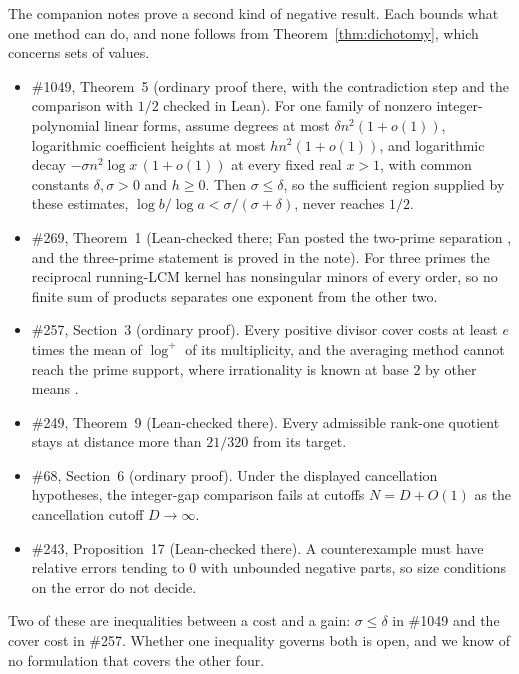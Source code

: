 \documentclass[11pt]{article}
\begin{document}
The companion notes prove a second kind of negative result.  Each bounds what
one method can do, and none follows from Theorem~\ref{thm:dichotomy}, which
concerns sets of values.
\begin{itemize}
\item \#1049, Theorem~5 \cite{plectis1049} (ordinary proof there, with the
  contradiction step and the comparison with $1/2$ checked in Lean).  For one
  family of nonzero integer-polynomial linear forms, assume degrees at most
  $\delta n^2(1+o(1))$, logarithmic coefficient heights at most
  $h n^2(1+o(1))$, and logarithmic decay
  $-\sigma n^2\log x\,(1+o(1))$ at every fixed real $x>1$, with common constants
  $\delta,\sigma>0$ and $h\ge0$.  Then $\sigma\le\delta$, so the sufficient
  region supplied by these estimates,
  $\log b/\log a<\sigma/(\sigma+\delta)$, never reaches $1/2$.
\item \#269, Theorem~1 \cite{plectis269} (Lean-checked there; Fan posted the
  two-prime separation \cite{fan2026comment}, and the three-prime statement is
  proved in the note).  For three primes the reciprocal
  running-LCM kernel has nonsingular minors of every order, so no finite sum of
  products separates one exponent from the other two.
\item \#257, Section~3 \cite{plectis257} (ordinary proof).  Every positive
  divisor cover costs at least $e$ times the mean of $\log^+$ of its
  multiplicity, and the averaging method cannot reach the prime support, where
  irrationality is known at base $2$ by other means \cite{taoteravainen2025}.
\item \#249, Theorem~9 \cite{plectis249} (Lean-checked there).  Every
  admissible rank-one quotient stays at distance more than $21/320$ from its
  target.
\item \#68, Section~6 \cite{plectis68} (ordinary proof).  Under the displayed
  cancellation hypotheses, the integer-gap comparison fails at cutoffs
  $N=D+O(1)$ as the cancellation cutoff $D\to\infty$.
\item \#243, Proposition~17 \cite{plectis243} (Lean-checked there).  A
  counterexample must have relative errors tending to $0$ with unbounded
  negative parts, so size conditions on the error do not decide.
\end{itemize}
Two of these are inequalities between a cost and a gain: $\sigma\le\delta$ in
\#1049 and the cover cost in \#257.  Whether one inequality governs both is
open, and we know of no formulation that covers the other four.
\end{document}
